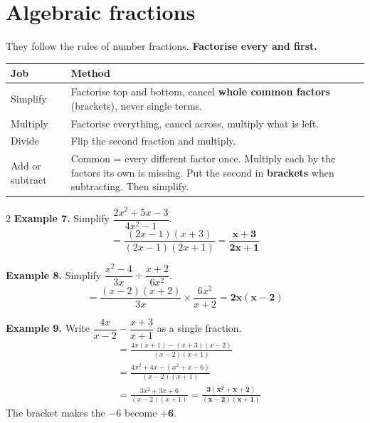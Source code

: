 \documentclass[11pt]{article}
\begin{document}
\section{Algebraic fractions}\label{h:fractions}
They follow the rules of number fractions. \textbf{Factorise every \Tnum{} and \Tden{} first.}

\begin{tabularx}{\textwidth}{@{}l X@{}}
\toprule
\textbf{Job} & \textbf{Method} \\ \midrule
Simplify & Factorise top and bottom, cancel \textbf{whole common factors} (brackets), never single terms. \\
Multiply & Factorise everything, cancel across, multiply what is left. \\
Divide & Flip the second fraction and multiply. \\
Add or subtract & Common \Tden{} = every different factor once. Multiply each \Tnum{} by the factors its own \Tden{} is missing. Put the second \Tnum{} in \textbf{brackets} when subtracting. Then simplify. \\
\bottomrule
\end{tabularx}

\begin{multicols}{2}
\textbf{Example 7.} Simplify $\dfrac{2x^{2}+5x-3}{4x^{2}-1}$.
\[ = \frac{(2x-1)(x+3)}{(2x-1)(2x+1)} = \mathbf{\frac{x+3}{2x+1}} \]

\textbf{Example 8.} Simplify $\dfrac{x^{2}-4}{3x} \div \dfrac{x+2}{6x^{2}}$.
\[ = \frac{(x-2)(x+2)}{3x} \times \frac{6x^{2}}{x+2} = \mathbf{2x(x-2)} \]
\columnbreak

\textbf{Example 9.} Write $\dfrac{4x}{x-2} - \dfrac{x+3}{x+1}$ as a single fraction.
\begin{align*}
&= \frac{4x(x+1) - (x+3)(x-2)}{(x-2)(x+1)}\\
&= \frac{4x^{2}+4x - (x^{2}+x-6)}{(x-2)(x+1)}\\
&= \frac{3x^{2}+3x+6}{(x-2)(x+1)} = \mathbf{\frac{3(x^{2}+x+2)}{(x-2)(x+1)}}
\end{align*}
The bracket makes the $-6$ become $\mathbf{+6}$.
\end{multicols}

\end{document}
